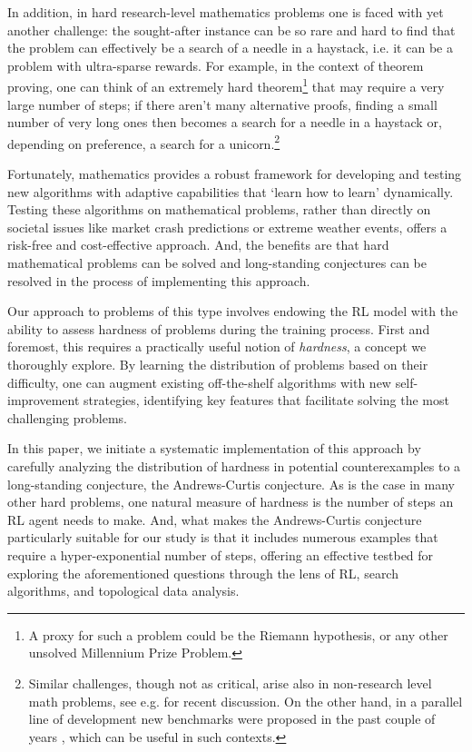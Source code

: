 In addition, in hard research-level mathematics problems one is faced with yet another challenge: the sought-after instance can be so rare and hard to find that the problem can effectively be a search of a needle in a haystack, i.e. it can be a problem with ultra-sparse rewards. For example, in the context of theorem proving, one can think of an extremely hard theorem\footnote{A proxy for such a problem could be the Riemann hypothesis, or any other unsolved Millennium Prize Problem.} that may require a very large number of steps; if there aren't many alternative proofs, finding a small number of very long ones then becomes a search for a needle in a haystack or, depending on preference, a search for a unicorn.\footnote{Similar challenges, though not as critical, arise also in non-research level math problems, see e.g. \cite{peano,trinh2024solving} for recent discussion. On the other hand, in a parallel line of development new benchmarks were proposed in the past couple of years \cite{procgen,NeedleInAHaystack}, which can be useful in such contexts.}

Fortunately, mathematics provides a robust framework for developing and testing new algorithms with adaptive capabilities that `learn how to learn' dynamically. Testing these algorithms on mathematical problems, rather than directly on societal issues like market crash predictions or extreme weather events, offers a risk-free and cost-effective approach. And, the benefits are that hard mathematical problems can be solved and long-standing conjectures can be resolved in the process of implementing this approach.

Our approach to problems of this type involves endowing the RL model with the ability to assess hardness of problems during the training process. First and foremost, this requires a practically useful notion of {\it hardness}, a concept we thoroughly explore. By learning the distribution of problems based on their difficulty, one can augment existing off-the-shelf algorithms with new self-improvement strategies, identifying key features that facilitate solving the most challenging problems.

In this paper, we initiate a systematic implementation of this approach by carefully analyzing the distribution of hardness in potential counterexamples to a long-standing conjecture, the Andrews-Curtis conjecture. As is the case in many other hard problems, one natural measure of hardness is the number of steps an RL agent needs to make. And, what makes the Andrews-Curtis conjecture particularly suitable for our study is that it includes numerous examples that require a hyper-exponential number of steps, offering an effective testbed for exploring the aforementioned questions through the lens of RL, search algorithms, and topological data analysis.

